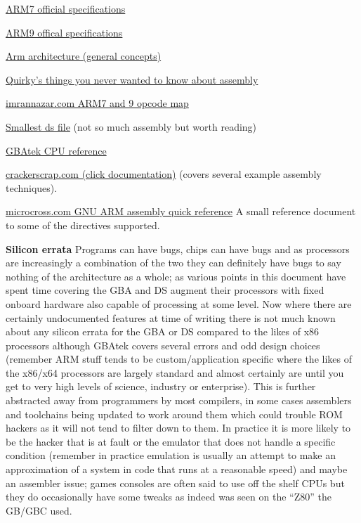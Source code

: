 \documentclass[
]{book}
\begin{document}
\href{http://infocenter.arm.com/help/topic/com.arm.doc.ddi0210c/index.html}{ARM7 official specifications}

\href{http://infocenter.arm.com/help/topic/com.arm.doc.ddi0201d/}{ARM9 offical specifications}

\href{http://www.scss.tcd.ie/~waldroj/3d1/arm_arm.pdf}{Arm architecture (general concepts)}

\href{http://quirkygba.blogspot.com/2008/12/things-you-never-wanted-to-know-about.html}{Quirky's things you never wanted to know about assembly}

\href{http://imrannazar.com/ARM-Opcode-Map}{imrannazar.com ARM7 and 9 opcode map}

\href{http://imrannazar.com/The-Smallest-NDS-File}{Smallest ds file} (not so much assembly but worth reading)

\href{http://problemkaputt.de/gbatek.htm\#cpuoverview}{GBAtek CPU reference}

\href{https://web.archive.org/web/20100606044629/http://crackerscrap.com/docs.php}{crackerscrap.com (click documentation)} (covers several example assembly techniques).

\href{http://microcross.com/GNU-ARM-Assy-Quick-Ref.pdf}{microcross.com GNU ARM assembly quick reference} A small reference document to some of the directives supported.

\textbf{Silicon errata} Programs can have bugs, chips can have bugs and as processors are increasingly a combination of the two they can definitely have bugs to say nothing of the architecture as a whole; as various points in this document have spent time covering the GBA and DS augment their processors with fixed onboard hardware also capable of processing at some level. Now where there are certainly undocumented features at time of writing there is not much known about any silicon errata for the GBA or DS compared to the likes of x86 processors although GBAtek covers several errors and odd design choices (remember ARM stuff tends to be custom/application specific where the likes of the x86/x64 processors are largely standard and almost certainly are until you get to very high levels of science, industry or enterprise). This is further abstracted away from programmers by most compilers, in some cases assemblers and toolchains being updated to work around them which could trouble ROM hackers as it will not tend to filter down to them. In practice it is more likely to be the hacker that is at fault or the emulator that does not handle a specific condition (remember in practice emulation is usually an attempt to make an approximation of a system in code that runs at a reasonable speed) and maybe an assembler issue; games consoles are often said to use off the shelf CPUs but they do occasionally have some tweaks as indeed was seen on the ``Z80'' the GB/GBC used.
\end{document}
